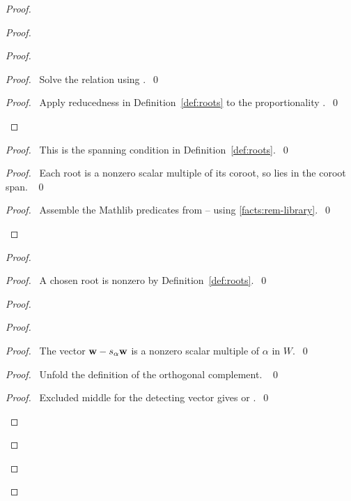 \begin{proof}
\begin{proof}
\begin{proof}
\begin{proof}\pf\ Solve the relation  using
.~\qed\end{proof}
\qedstep
\begin{proof}\pf\ Apply reducedness in Definition~\ref{def:roots}
to the proportionality .~\qed\end{proof}
\end{proof}
\begin{proof}\pf\ This is the spanning condition in Definition~\ref{def:roots}.~\qed\end{proof}
\begin{proof}\pf\ Each root is a nonzero scalar multiple of its coroot,
so  lies in the coroot span. ~\qed\end{proof}
\qedstep
\begin{proof}\pf\ Assemble the Mathlib predicates from
-- using \ref{facts:rem-library}.~\qed\end{proof}
\end{proof}
\begin{proof}
\begin{proof}\pf\ A chosen root is nonzero by Definition~\ref{def:roots}.~\qed\end{proof}
\begin{proof}
\begin{proof}
\begin{proof}\pf\ The vector ${\mathbf w}-s_\alpha{\mathbf w}$ is a nonzero scalar
multiple of $\alpha$ in $W$.~\qed\end{proof}
\begin{proof}\pf\ Unfold the definition of the orthogonal complement. ~\qed\end{proof}
\qedstep
\begin{proof}\pf\ Excluded middle for the detecting vector gives
 or .~\qed\end{proof}

\end{proof}
\end{proof}
\end{proof}
\end{proof}
